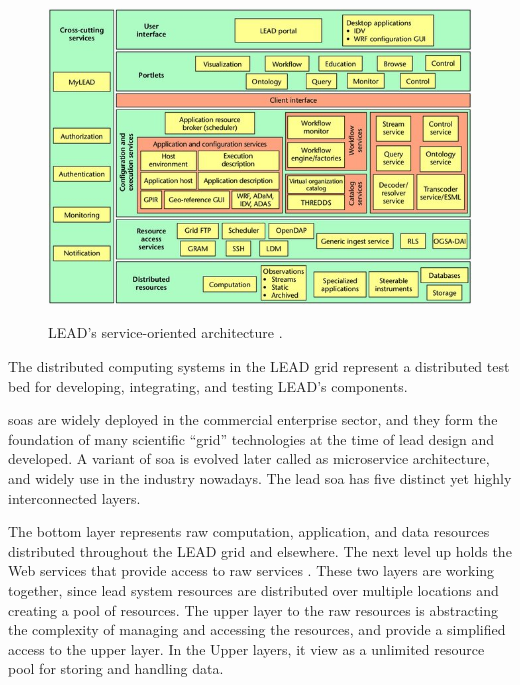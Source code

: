 \begin{figure}[htp]
    \centering
    \includegraphics[width=1\textwidth]{lead/LEADs-service-oriented-architecture-A-wide-variety-of-services-and-resources-grouped_W640.jpg}\\
    \caption[LEAD's service-oriented architecture]{LEAD's service-oriented architecture \cite{Droegemeier2005Service-OrientedWeather}.}
    \label{fi:lead_soa}
\end{figure}

The distributed computing systems in the LEAD grid represent a distributed test bed for developing, integrating, and testing LEAD's components.

\acrshort{soa}s are widely deployed in the commercial enterprise sector, and they form the foundation of many scientific “grid” technologies at the time of \acrshort{lead} design and developed. A variant of \acrshort{soa} is evolved later called as microservice architecture, and widely use in the industry nowadays. The \acrshort{lead} \acrshort{soa} has five distinct yet highly interconnected layers. 

The bottom layer represents raw computation, application, and data resources distributed throughout the LEAD grid and elsewhere. The next level up holds the Web services that provide access to raw services \cite{Droegemeier2005Service-OrientedWeather}. These two layers are working together, since \acrshort{lead} system resources are distributed over multiple locations and creating a pool of resources. The upper layer to the raw resources is abstracting the complexity of managing and accessing the resources, and provide a simplified access to the upper layer. In the Upper layers, it view as a unlimited resource pool for storing and handling data.

